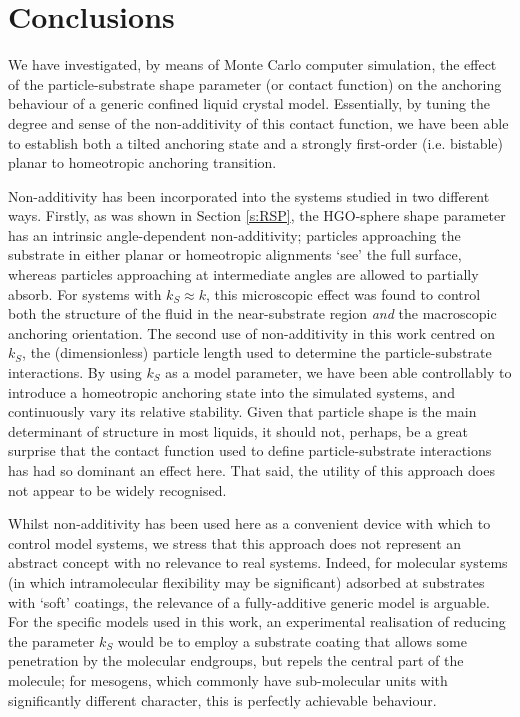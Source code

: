 \documentclass[aps,10pt,twocolumn]{revtex4}
\begin{document}
\section{Conclusions}
\label{s:CCL}

We have investigated, by means of Monte Carlo computer simulation, the effect of the particle-substrate shape
parameter (or contact function) on the anchoring behaviour of a generic confined liquid crystal model.
Essentially, by tuning the degree and sense of the non-additivity of this contact function, we have been able to
establish both a tilted anchoring state and a strongly first-order (i.e. bistable) planar to homeotropic anchoring
transition.

Non-additivity has been incorporated into the systems studied in two different ways. Firstly, as was shown in
Section \ref{s:RSP}, the HGO-sphere shape parameter has an intrinsic angle-dependent non-additivity; particles
approaching the substrate in either planar or homeotropic alignments `see' the full surface, whereas particles
approaching at intermediate angles are allowed to partially absorb. For systems with $k_S \approx k$, this
microscopic effect was found to control both the structure of the fluid in the near-substrate region {\em and} the
macroscopic anchoring orientation. The second use of non-additivity in this work centred on $k_S$, the
(dimensionless) particle length used to determine the particle-substrate interactions. By using $k_S$ as a model
parameter, we have been able controllably to introduce a homeotropic anchoring state into the simulated systems,
and continuously vary its relative stability. Given that particle shape is the main determinant of structure in
most liquids, it should not, perhaps, be a great surprise that the contact function used to define
particle-substrate interactions has had so dominant an effect here. That said, the utility of this approach does
not appear to be widely recognised.

Whilst non-additivity has been used here as a convenient device with which to control model systems, we stress
that this approach does not represent an abstract concept with no relevance to real systems. Indeed, for molecular
systems (in which intramolecular flexibility may be significant) adsorbed at substrates with `soft' coatings, the
relevance of a fully-additive generic model is arguable. For the specific models used in this work, an
experimental realisation of reducing the parameter $k_S$ would be to employ a substrate coating that allows some
penetration by the molecular endgroups, but repels the central part of the molecule; for mesogens, which commonly
have sub-molecular units with significantly different character, this is perfectly achievable behaviour.
\end{document}
